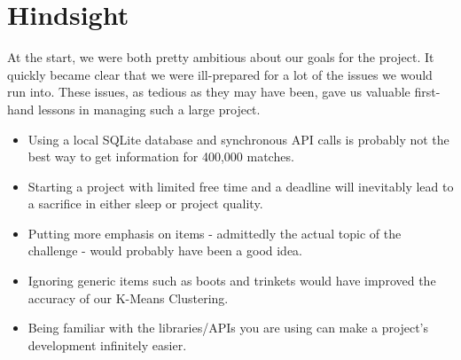 \documentclass{article}
\begin{document}
\section{Hindsight}
At the start, we were both pretty ambitious about our goals for the project. It quickly became clear that we were ill-prepared for a lot of the issues we would run into. These issues, as tedious as they may have been, gave us valuable first-hand lessons in managing such a large project.

\begin{itemize}
    \item Using a local SQLite database and synchronous API calls is probably not the best way to get information for 400,000 matches.
    \item Starting a project with limited free time and a deadline will inevitably lead to a sacrifice in either sleep or project quality.
    \item Putting more emphasis on items - admittedly the actual topic of the challenge - would probably have been a good idea.
    \item Ignoring generic items such as boots and trinkets would have improved the accuracy of our K-Means Clustering.
    \item Being familiar with the libraries/APIs you are using can make a project's development infinitely easier.
\end{itemize}


\end{document}
